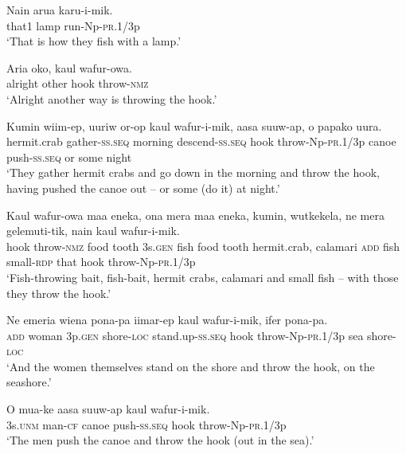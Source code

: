 {\ea\label{ex:a:x48}
\gll  Nain  arua  karu-i-mik. \\
that1  lamp  run-Np-\textsc{pr}.1/3p \\
\glt ‘That is how they fish with a lamp.’ \\
\z


\ea\label{ex:a:x49}
\gll  Aria  oko,  kaul  wafur-owa. \\
alright  other  hook  throw-\textsc{nmz} \\
\glt ‘Alright another way is throwing the hook.’ \\
\z


\ea\label{ex:a:x50}
\gll  Kumin  wiim-ep,  uuriw  or-op  kaul                   wafur-i-mik,  aasa  suuw-ap,  o  papako  uura. \\
hermit.crab  gather-\textsc{ss.seq}  morning  descend-\textsc{ss.seq}  hook   throw-Np-\textsc{pr}.1/3p  canoe  push-\textsc{ss.seq}  or  some  night \\


\glt ‘They gather hermit crabs and go down in the morning and throw the hook, having pushed the canoe out – or some (do it) at night.’ \\
\z


\ea\label{ex:a:x51}
\gll  Kaul  wafur-owa  maa  eneka,  ona  mera  maa  eneka,   kumin,  wutkekela,  ne  mera  gelemuti-tik,        nain  kaul  wafur-i-mik. \\
hook  throw-\textsc{nmz}  food  tooth  3s.\textsc{gen}  fish  food  tooth      hermit.crab,  calamari  \textsc{add}  fish  small-\textsc{rdp}       that  hook  throw-Np-\textsc{pr}.1/3p \\




\glt ‘Fish-throwing bait, fish-bait, hermit crabs, calamari and small fish – with those they throw the hook.’ \\
\z


\ea\label{ex:a:x52}
\gll  Ne  emeria  wiena  pona-pa  iimar-ep       kaul  wafur-i-mik,  ifer  pona-pa. \\
\textsc{add}  woman  3p.\textsc{gen}  shore-\textsc{loc}  stand.up-\textsc{ss.seq}   hook  throw-Np-\textsc{pr}.1/3p  sea  shore-\textsc{loc} \\


\glt ‘And the women themselves stand on the shore and throw the hook, on the seashore.’ \\
\z


\ea\label{ex:a:x53}
\gll  O  mua-ke  aasa  suuw-ap  kaul  wafur-i-mik. \\
3s.\textsc{unm}  man-\textsc{cf}  canoe  push-\textsc{ss.seq}  hook  throw-Np-\textsc{pr}.1/3p \\
\glt ‘The men push the canoe and throw the hook (out in the sea).’ \\
\z


}
